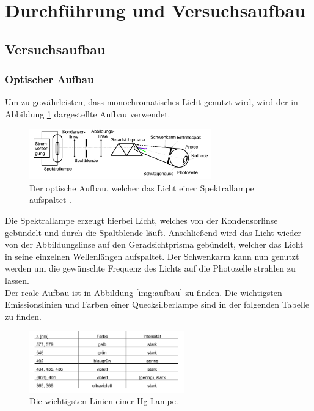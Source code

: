 \newpage
\section{Durchführung und Versuchsaufbau}



 \subsection{Versuchsaufbau}

    \subsubsection{Optischer Aufbau}

    \noindent Um zu gewährleisten, dass monochromatisches Licht genutzt wird, wird der in Abbildung \ref{img:linse} dargestellte Aufbau verwendet.


    \begin{figure}[H]
        \centering
        \includegraphics[width=0.7\textwidth]{latex/images/Optiken.PNG}
        \caption{Der optische Aufbau, welcher das Licht einer Spektrallampe aufspaltet  \protect \cite{500}.}
        \label{img:linse}
    \end{figure}

    \noindent Die Spektrallampe erzeugt hierbei Licht, welches von der Kondensorlinse gebündelt und durch die Spaltblende läuft.
    Anschließend wird das Licht wieder von der Abbildungslinse auf den Geradsichtprisma gebündelt, welcher das Licht in seine einzelnen Wellenlängen aufspaltet.
    Der Schwenkarm kann nun genutzt werden um die gewünschte Frequenz des Lichts auf die Photozelle strahlen zu lassen.\\
    Der reale Aufbau ist in Abbildung \ref{img:aufbau} zu finden.
    Die wichtigsten Emissionslinien und Farben einer Quecksilberlampe sind in der folgenden Tabelle zu finden.

    \begin{figure}[H]
        \centering
        \includegraphics[width=0.6\textwidth]{latex/images/Hg.PNG}
        \caption{Die wichtigsten Linien einer Hg-Lampe\protect \cite{500}.}
        \label{img:Hg}
    \end{figure}

